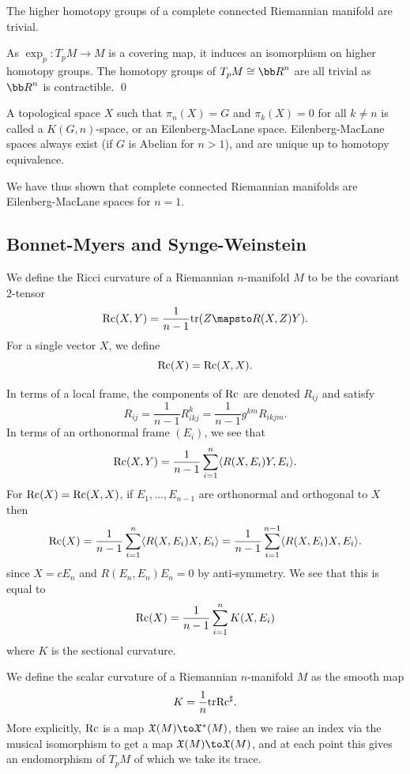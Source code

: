 \eproof

\bcoro

    The higher homotopy groups of a complete connected Riemannian manifold are trivial.

\ecoro

\bproof

    As $\exp_p\colon T_pM\to M$ is a covering map, it induces an isomorphism on higher homotopy groups.
    The homotopy groups of $T_pM\cong\bR^n$ are all trivial as $\bR^n$ is contractible.
    \qed

\eproof

\bnote

    A topological space $X$ such that $\pi_n(X)=G$ and $\pi_k(X)=0$ for all $k\neq n$ is called a $K(G,n)$-space, or an {\emphcolor Eilenberg-MacLane space}.
    Eilenberg-MacLane spaces always exist (if $G$ is Abelian for $n>1$), and are unique up to homotopy equivalence.

    We have thus shown that complete connected Riemannian manifolds are Eilenberg-MacLane spaces for $n=1$.

\enote

\subsection{Bonnet-Myers and Synge-Weinstein}

\bdefn

    We define the {\emphcolor Ricci curvature} of a Riemannian $n$-manifold $M$ to be the covariant $2$-tensor
    $$ \Rc(X,Y) = \frac1{n-1}\tr(Z\mapsto R(X,Z)Y) . $$
    For a single vector $X$, we define
    $$ {\rm Rc}(X) = {\rm Rc}(X,X) . $$

\edefn

In terms of a local frame, the components of ${\rm Rc}$ are denoted $R_{ij}$ and satisfy
$$ R_{ij} = \frac1{n-1}R_{ikj}^k = \frac1{n-1}g^{km}R_{ikjm} . $$
In terms of an orthonormal frame $(E_i)$, we see that
$$ {\rm Rc}(X,Y) = {{1}\over{n-1}}\sum_{i=1}^n\mathopen{}\mathclose{\left<R(X,E_i)Y,E_i\right>} . $$
For ${\rm Rc}(X)={\rm Rc}(X,X)$, if $E_1,\dots,E_{n-1}$ are orthonormal and orthogonal to $X$ then
$$ {\rm Rc}(X) = {{1}\over{n-1}}\sum_{i=1}^n\mathopen{}\mathclose{\left<R(X,E_i)X,E_i\right>} = {{1}\over{n-1}}\sum_{i=1}^{n-1}\mathopen{}\mathclose{\left<R(X,E_i)X,E_i\right>} . $$
since $X=cE_n$ and $R(E_n,E_n)E_n=0$ by anti-symmetry.
We see that this is equal to
$$ {\rm Rc}(X) = {{1}\over{n-1}}\sum_{i=1}^nK(X,E_i) $$
where $K$ is the sectional curvature.

\bdefn

    We define the {\emphcolor scalar curvature} of a Riemannian $n$-manifold $M$ as the smooth map
    $$ K = {{1}\over{n}}{\rm tr}{\rm Rc}^\sharp . $$
    More explicitly, ${\rm Rc}$ is a map $\X(M)\to\X^*(M)$, then we raise an index via the musical isomorphism to get
    a map $\X(M)\to\X(M)$, and at each point this gives an endomorphism of $T_pM$ of which we take its trace.

